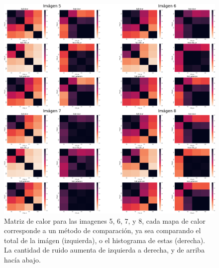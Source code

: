 \begin{figure}
    \centering
    \includegraphics[width=\textwidth]{figuras/heatmaps/heatmaps_app_1.png}
    \caption{Matriz de calor para las imagenes 5, 6, 7, y 8, cada mapa de calor corresponde a un m\'etodo de comparaci\'on, ya sea comparando el total de la im\'agen (izquierda), o el histograma de estas (derecha). La cantidad de ruido aumenta de izquierda a derecha, y de arriba hacía abajo.}
\end{figure}


